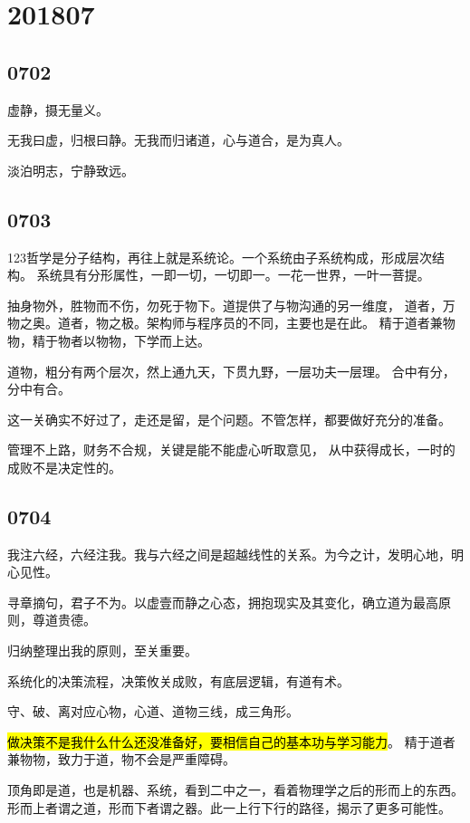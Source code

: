 \section{201807}

\subsection{0702}

虚静，摄无量义。

无我曰虚，归根曰静。无我而归诸道，心与道合，是为真人。

淡泊明志，宁静致远。

\subsection{0703}

123哲学是分子结构，再往上就是系统论。一个系统由子系统构成，形成层次结构。
系统具有分形属性，一即一切，一切即一。一花一世界，一叶一菩提。

抽身物外，胜物而不伤，勿死于物下。道提供了与物沟通的另一维度，
道者，万物之奥。道者，物之极。架构师与程序员的不同，主要也是在此。
精于道者兼物物，精于物者以物物，下学而上达。

道物，粗分有两个层次，然上通九天，下贯九野，一层功夫一层理。
合中有分，分中有合。

这一关确实不好过了，走还是留，是个问题。不管怎样，都要做好充分的准备。

管理不上路，财务不合规，关键是能不能虚心听取意见，
从中获得成长，一时的成败不是决定性的。

\subsection{0704}

我注六经，六经注我。我与六经之间是超越线性的关系。为今之计，发明心地，明心见性。

寻章摘句，君子不为。以虚壹而静之心态，拥抱现实及其变化，确立道为最高原则，尊道贵德。

归纳整理出我的原则，至关重要。

系统化的决策流程，决策攸关成败，有底层逻辑，有道有术。

守、破、离对应心物，心道、道物三线，成三角形。

\hl{做决策不是我什么什么还没准备好，要相信自己的基本功与学习能力}。
精于道者兼物物，致力于道，物不会是严重障碍。

顶角即是道，也是机器、系统，看到二中之一，看着物理学之后的形而上的东西。
形而上者谓之道，形而下者谓之器。此一上行下行的路径，揭示了更多可能性。

